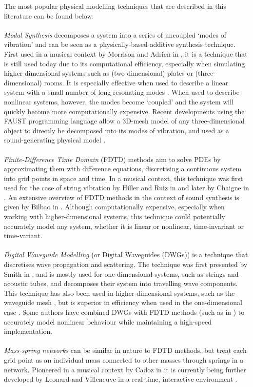 The most popular physical modelling techniques that are described in this literature can be found below:
\\
\\
\textit{Modal Synthesis} decomposes a system into a series of uncoupled `modes of vibration' and can be seen as a physically-based additive synthesis technique. First used in a musical context by Morrison and Adrien in \cite{Morrison1993}, it is a technique that is still used today due to its computational efficiency, especially when simulating higher-dimensional systems such as (two-dimensional) plates or (three-dimensional) rooms. It is especially effective when used to describe a linear system with a small number of long-resonating modes \cite{Bilbao2018, Smith2010a}. When used to describe nonlinear systems, however, the modes become `coupled’ and the system will quickly become more computationally expensive. Recent developments using the FAUST programming language allow a 3D-mesh model of any three-dimensional object to directly be decomposed into its modes of vibration, and used as a sound-generating physical model \cite{MichonMesh2Faust2017}.
\\
\\
\textit{Finite-Difference Time Domain} (FDTD) methods  aim to solve PDEs by approximating them with difference equations, discretising a continuous system into grid points in space and time. In a musical context, this technique was first used for the case of string vibration by Hiller and Ruiz in \cite{Ruiz1969, Hiller1971I, Hiller1971II} and later by Chaigne in \cite{Chaigne1992, Chaigne1994}. An extensive overview of FDTD methods in the context of sound synthesis is given by Bilbao in \cite{theBible}. Although computationally expensive, especially when working with higher-dimensional systems, this technique could potentially accurately model any system, whether it is linear or nonlinear, time-invariant or time-variant.
\\
\\
\textit{Digital Waveguide Modelling} (or Digital Waveguides (DWGs)) is a technique that discretises wave propagation and scattering. The technique was first presented by Smith in \cite{Smith1987, Smith1992}, and is mostly used for one-dimensional systems, such as strings and acoustic tubes, and decomposes their system into travelling wave components. This technique has also been used in higher-dimensional systems, such as the waveguide mesh \cite{Duyne1993}, but is superior in efficiency when used in the one-dimensional case \cite{Valimaki2006}. Some authors have combined DWGs with FDTD methods (such as in \cite{Erkut2002, Maestre2014}) to accurately model nonlinear behaviour while maintaining a high-speed implementation.
\\
\\
\textit{Mass-spring networks} can be similar in nature to FDTD methods, but treat each grid point as an individual mass connected to other masses through springs in a network. Pioneered in a musical context by Cadoz in \cite{Cadoz1979, Cadoz1983, Cadoz1993} it is currently being further developed by Leonard and Villeneuve in a real-time, interactive environment \cite{Villeneuve2019, Leonard2019}.

